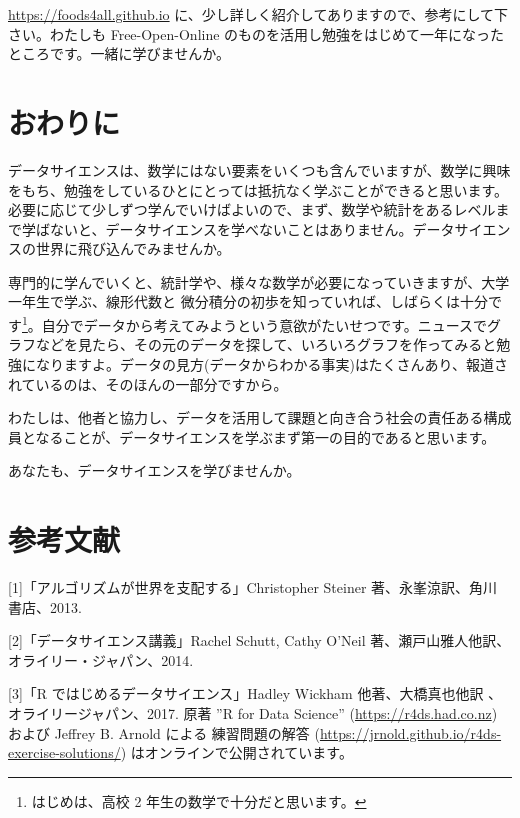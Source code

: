 \documentclass[
]{book}
\theoremstyle{definition}
\theoremstyle{definition}
\theoremstyle{definition}
\theoremstyle{definition}
\theoremstyle{remark}
\begin{document}
\url{https://foods4all.github.io} に、少し詳しく紹介してありますので、参考にして下さい。わたしも Free-Open-Online のものを活用し勉強をはじめて一年になったところです。一緒に学びませんか。

\hypertarget{ux304aux308fux308aux306b-1}{%
\section{おわりに}\label{ux304aux308fux308aux306b-1}}

データサイエンスは、数学にはない要素をいくつも含んでいますが、数学に興味をもち、勉強をしているひとにとっては抵抗なく学ぶことができると思います。必要に応じて少しずつ学んでいけばよいので、まず、数学や統計をあるレベルまで学ばないと、データサイエンスを学べないことはありません。データサイエンスの世界に飛び込んでみませんか。

専門的に学んでいくと、統計学や、様々な数学が必要になっていきますが、大学一年生で学ぶ、線形代数と 微分積分の初歩を知っていれば、しばらくは十分です\footnote{はじめは、高校 2 年生の数学で十分だと思います。}。自分でデータから考えてみようという意欲がたいせつです。ニュースでグラフなどを見たら、その元のデータを探して、いろいろグラフを作ってみると勉強になりますよ。データの見方(データからわかる事実)はたくさんあり、報道されているのは、そのほんの一部分ですから。

わたしは、他者と協力し、データを活用して課題と向き合う社会の責任ある構成員となることが、データサイエンスを学ぶまず第一の目的であると思います。

あなたも、データサイエンスを学びませんか。

\hypertarget{ux53c2ux8003ux6587ux732e}{%
\section*{参考文献}\label{ux53c2ux8003ux6587ux732e}}

{[}1{]}「アルゴリズムが世界を支配する」Christopher Steiner 著、永峯涼訳、角川 書店、2013.

{[}2{]}「データサイエンス講義」Rachel Schutt, Cathy O'Neil 著、瀬戸山雅人他訳、オライリー・ジャパン、2014.

{[}3{]}「R ではじめるデータサイエンス」Hadley Wickham 他著、大橋真也他訳 、オライリージャパン、2017. 原著 ''R for Data Science'' (\url{https://r4ds.had.co.nz}) および Jeffrey B. Arnold による 練習問題の解答
(\url{https://jrnold.github.io/r4ds-exercise-solutions/}) はオンラインで公開されています。
\end{document}
